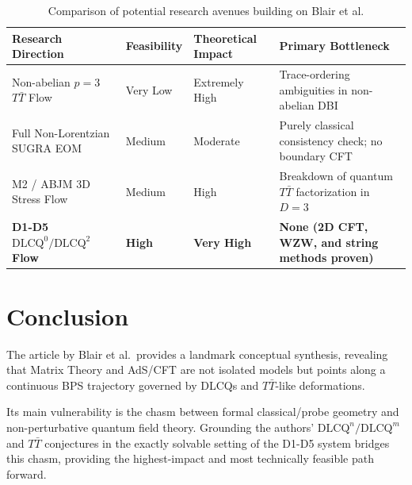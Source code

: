 \documentclass[11pt,a4paper]{article}
\begin{document}
\begin{table}[htbp]
\centering
\small
\begin{tabularx}{\textwidth}{@{}l l l X@{}}
\toprule
\textbf{Research Direction} & \textbf{Feasibility} & \textbf{Theoretical Impact} & \textbf{Primary Bottleneck} \\ \midrule
Non-abelian $p=3$ $T\bar{T}$ Flow & Very Low & Extremely High & Trace-ordering ambiguities in non-abelian DBI \\ \addlinespace
Full Non-Lorentzian SUGRA EOM & Medium & Moderate & Purely classical consistency check; no boundary CFT \\ \addlinespace
M2 / ABJM 3D Stress Flow & Medium & High & Breakdown of quantum $T\bar{T}$ factorization in $D=3$ \\ \addlinespace
\textbf{D1-D5 $\text{DLCQ}^0/\text{DLCQ}^2$ Flow} & \textbf{High} & \textbf{Very High} & \textbf{None (2D CFT, WZW, and string methods proven)} \\ \bottomrule
\end{tabularx}
\caption{Comparison of potential research avenues building on Blair et al.}
\label{tab:comparison}
\end{table}

\vspace{-1em}
\section{Conclusion}
\label{sec:conclusion}
The article by Blair et al.\ provides a landmark conceptual synthesis, revealing that Matrix Theory and AdS/CFT are not isolated models but points along a continuous BPS trajectory governed by DLCQs and $T\bar{T}$-like deformations. 

Its main vulnerability is the chasm between formal classical/probe geometry and non-perturbative quantum field theory. Grounding the authors' $\text{DLCQ}^n/\text{DLCQ}^m$ and $T\bar{T}$ conjectures in the exactly solvable setting of the D1-D5 system bridges this chasm, providing the highest-impact and most technically feasible path forward.
\end{document}
